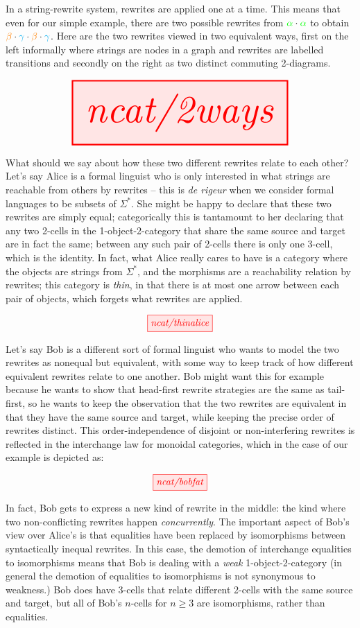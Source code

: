  In a string-rewrite system, rewrites are applied one at a time. This means that even for our simple example, there are two possible rewrites from $\textcolor{green}{\alpha} \cdot \textcolor{green}{\alpha}$ to obtain $\textcolor{orange}{\beta} \cdot \textcolor{cyan}{\gamma} \cdot \textcolor{orange}{\beta} \cdot \textcolor{cyan}{\gamma}$. Here are the two rewrites viewed in two equivalent ways, first on the left informally where strings are nodes in a graph and rewrites are labelled transitions and secondly on the right as two distinct commuting 2-diagrams.

\[\resizebox{0.8\textwidth}{!}{\tikzfig{ncat/2ways}}\]

What should we say about how these two different rewrites relate to each other? Let's say Alice is a formal linguist who is only interested in what strings are reachable from others by rewrites -- this is \emph{de rigeur} when we consider formal languages to be subsets of $\Sigma^*$. She might be happy to declare that these two rewrites are simply equal; categorically this is tantamount to her declaring that any two 2-cells in the 1-object-2-category that share the same source and target are in fact the same; between any such pair of 2-cells there is only one 3-cell, which is the identity. In fact, what Alice really cares to have is a category where the objects are strings from $\Sigma^*$, and the morphisms are a reachability relation by rewrites; this category is \emph{thin}, in that there is at most one arrow between each pair of objects, which forgets what rewrites are applied.

\[\tikzfig{ncat/thinalice}\]

Let's say Bob is a different sort of formal linguist who wants to model the two rewrites as nonequal but equivalent, with some way to keep track of how different equivalent rewrites relate to one another. Bob might want this for example because he wants to show that head-first rewrite strategies are the same as tail-first, so he wants to keep the observation that the two rewrites are equivalent in that they have the same source and target, while keeping the precise order of rewrites distinct. This order-independence of disjoint or non-interfering rewrites is reflected in the interchange law for monoidal categories, which in the case of our example is depicted as:

\[\tikzfig{ncat/bobfat}\]

In fact, Bob gets to express a new kind of rewrite in the middle: the kind where two non-conflicting rewrites happen \emph{concurrently}. The important aspect of Bob's view over Alice's is that equalities have been replaced by isomorphisms between syntactically inequal rewrites. In this case, the demotion of interchange equalities to isomorphisms means that Bob is dealing with a \emph{weak} 1-object-2-category (in general the demotion of equalities to isomorphisms is not synonymous to weakness.) Bob does have 3-cells that relate different 2-cells with the same source and target, but all of Bob's $n$-cells for $n \geq 3$ are isomorphisms, rather than equalities.


